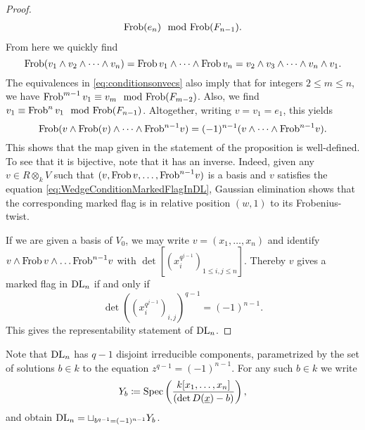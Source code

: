 \documentclass[../main.tex]{subfiles}
\begin{document}
\begin{prop}
\begin{proof}
\begin{equation}
\begin{aligned}
    \mathrm{Frob}(e_n) \mod {\mathrm{Frob}}(F_{n-1}).
  \end{aligned}
\end{equation}
  From here we quickly find
  \begin{equation*}
    \mathrm{Frob}(v_1 \wedge v_2 \wedge \dots \wedge v_n) = 
    \mathrm{Frob}\, v_1 \wedge \dots \wedge \mathrm{Frob}\, v_n = v_2 \wedge v_3
    \wedge \dots \wedge v_{n} \wedge v_1.
  \end{equation*}
  The equivalences in \eqref{eq:conditionsonvecs} also imply that for integers
  $2 \leq m \leq n$, we have $\mathrm{Frob}^{m-1} \, v_1
  \equiv v_m \mod {\mathrm{Frob}}(F_{m-2})$. Also, we find $v_1 \equiv \mathrm{Frob}^n \, v_1 \mod {\mathrm{Frob}}
  (F_{n-1})$. Altogether, writing $v = v_1 = e_1$, this yields 
  \begin{equation}\label{eq:WedgeConditionMarkedFlagInDL}
    \mathrm{Frob} (v \wedge \mathrm{Frob}(v) \wedge \dots \wedge \mathrm{Frob}^{n-1} v) = 
    (-1)^{n-1} (v \wedge \dots \wedge \mathrm{Frob}^{n-1}v).
  \end{equation}
  This shows that the map given in the statement of the proposition is
  well-defined. To see that it is bijective, note that it has an inverse. Indeed,
  given any $v \in R \otimes_k V$ such that $(v, \mathrm{Frob}\, v, \dots, \mathrm{Frob}^{n-1} v)$
  is a basis and $v$ satisfies the equation \eqref{eq:WedgeConditionMarkedFlagInDL},
  Gaussian elimination shows that the corresponding marked flag is in relative
  position $(w,1)$ to its Frobenius-twist.

  If we are given a basis of $V_0$, we may write $v = (x_1, \dots, x_n)$
  and identify $v \wedge \mathrm{Frob}\, v \wedge \dots \mathrm{Frob}^{n-1} v$ with
  $\det\left[ (x_i^{q^{j-1}})_{1 \leq i,j \leq n} \right]$.
  Thereby $v$ gives a marked flag in $\mathrm{DL}_n$ if and only if
  \begin{equation*}
    \det((x_i^{q^{j-1}})_{i,j})^{q-1} = (-1)^{n-1}.
  \end{equation*}
  This gives the representability statement of $\mathrm{DL}_n$.
\end{proof}
\end{prop}

Note that $\mathrm{DL}_n$ has $q-1$ disjoint irreducible components, parametrized by the set
of solutions $b \in k$ to the equation $z^{q-1}=(-1)^{n-1}$. For any such $b
\in k$ we write 
\begin{equation}\label{eq:DefYb}
  Y_b \coloneqq \operatorname{Spec} \left(\frac{k[x_1, \dots, x_n]}{(\det D(\underline x) - b)}\right),
\end{equation}
and obtain $\mathrm{DL}_n = \sqcup_{b^{q-1} = (-1)^{n-1}} Y_b$.
\end{document}
